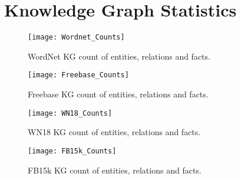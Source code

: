 \chapter{Knowledge Graph Statistics} 

\ifpdf
     \graphicspath{{Figs/Chapter4/}}
\else
    \graphicspath{{Chapter4/Figs/Vector/}{Chapter4/Figs/}}
\fi

\begin{figure}[H]
	\parbox{.5\linewidth}{
   		\centering
    		\texttt{[image: Wordnet\_Counts]}
		\captionsetup{justification=centering}
		\caption{WordNet KG count of entities, relations and facts.}
		}
	\hfill
	\parbox{.5\linewidth}{
   		\centering
    		\texttt{[image: Freebase\_Counts]}
		\captionsetup{justification=centering}
		\caption{Freebase KG count of entities, relations and facts.}
		}
\end{figure}

\begin{figure}[H]
	\parbox{.5\linewidth}{
   		\centering
    		\texttt{[image: WN18\_Counts]}
		\captionsetup{justification=centering}
		\caption{WN18 KG count of entities, relations and facts.}
		}
	\hfill
	\parbox{.5\linewidth}{
   		\centering
    		\texttt{[image: FB15k\_Counts]}
		\caption{FB15k KG count of entities, relations and facts.}
		}
\end{figure}


